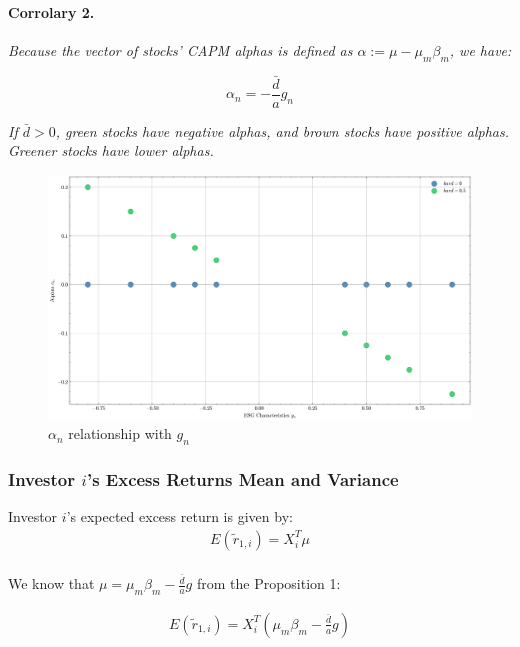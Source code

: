 \paragraph{Corrolary 2.} \textit{Because the vector of stocks' CAPM alphas is defined as 
$\alpha := \mu - \mu_m \beta_m$, we have:}

\begin{equation}
    \alpha_n = - \frac{\bar{d}}{a} g_n
\end{equation}

\textit{If $\bar{d} > 0$, green stocks have negative alphas, and brown stocks 
have positive alphas. Greener stocks have lower alphas.}


\begin{figure}
    \centering
    \includegraphics[width=1\textwidth]{../images/chapter01/alphas_vs_esg_characteristics.png}
    \caption{$\alpha_n$ relationship with $g_n$}
    \label{fig:esg_returns}
\end{figure}

\subsubsection{Investor $i$'s Excess Returns Mean and Variance}

Investor $i$'s expected excess return is given by:
\begin{equation}
    \begin{aligned}
E(\tilde{r}_{1,i}) = X_i^T \mu \\ 
    \end{aligned}
\end{equation}

We know that $\mu = \mu_m \beta_m - \frac{\bar{d}}{a} g$ from the Proposition 1:

\begin{equation}
    \begin{aligned}
E(\tilde{r}_{1,i}) = X_i^T (\mu_m \beta_m - \frac{\bar{d}}{a} g) \\
    \end{aligned}
\end{equation}

